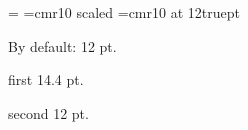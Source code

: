 

\magnification=
\font\first=cmr10 scaled
\font\second=cmr10 at 12truept

By default: 12 pt.

{\first first 14.4 pt.}

{\second second 12 pt.}

\bye


